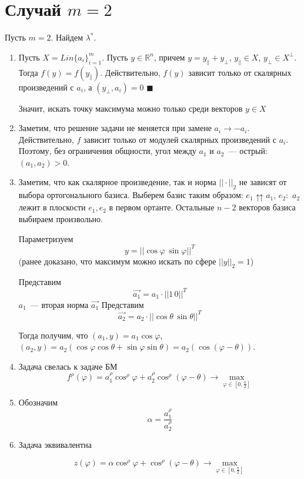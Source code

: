 \documentclass[a4paper]{article}
\newcommand{\matrixr}{\right|\right|}
\newcommand{\matrixl}{\left|\left|}
\begin{document}
\section*{Случай $m=2$}
Пусть $m=2$. Найдем $\lambda^*$.
\begin{enumerate}
\item Пусть $X=Lin\{a_i\}_{i=1}^m$. Пусть $y\in\mathbb{R}^n$, причем $y=y_\parallel+y_\bot$, $y_\parallel\in X$, $y_\bot\in X^\bot$. Тогда $f(y)=f(y_\parallel)$. Действительно, $f(y)$ зависит только от скалярных произведений с $a_i$, а $(y_\bot,a_i)=0$ $\blacksquare$

Значит, искать точку максимума можно только среди векторов $y\in X$

\item Заметим, что решение задачи не меняется при замене $a_i\to-a_i$. Действительно, $f$ зависит только от модулей скалярных произведений с $a_i$. Поэтому, без ограничения общности, угол между $a_1$ и $a_2$~--- острый: $(a_1,a_2)>0$.

\item Заметим, что как скалярное произведение, так и норма $||\cdot||_2$ не зависят от выбора ортогонального базиса. Выберем базис таким образом: $e_1\upuparrows a_1$, $e_2\colon $ $a_2$ лежит в плоскости $e_1, e_2$ в первом ортанте. Остальные $n-2$ векторов базиса выбираем произвольно.

Параметризуем $$y=\matrixl \cos\varphi \, \sin\varphi \matrixr^T$$ (ранее доказано, что максимум можно искать по сфере $||y||_2=1$)

Представим $$\vec{a_1}=a_1 \cdot \matrixl 1\, 0\matrixr^T$$ $a_1$~--- вторая норма $\vec{a_1}$
Представим $$\vec{a_2}=a_2 \cdot \matrixl \cos\theta\, \sin\theta\matrixr^T$$

Тогда получим, что $(a_1,y)=a_1\cos\varphi$, $(a_2,y)=a_2(\cos\varphi\cos\theta+\sin\varphi\sin\theta)=a_2(\cos(\varphi-\theta))$.

\item Задача свелась к задаче БМ $$f^\rho(\varphi)=a_1^\rho\cos^\rho\varphi+a_2^\rho\cos^\rho(\varphi-\theta)\to\max\limits_{\varphi\in[0,\frac{\pi}{2}]}$$

\item Обозначим $$\alpha=\frac{a_1^\rho}{a_2^\rho}$$

\item Задача эквивалентна

$$z(\varphi)=\alpha\cos^\rho\varphi+\cos^\rho(\varphi-\theta)\to\max\limits_{\varphi\in[0,\frac{\pi}{2}]}$$


\end{enumerate}
\end{document}
